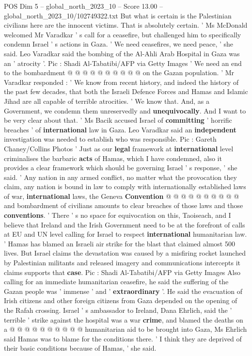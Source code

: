\begin{textsample}{POS Dim 5 – global\_north\_2023\_10 – Score 13.00 – global\_north\_2023\_10/102749322.txt}
But what is certain is the Palestinian civilians here are the innocent victims.
That is absolutely certain. ' Ms McDonald welcomed Mr Varadkar ' s call for a ceasefire, but challenged him to specifically condemn Israel ' s actions in Gaza. ' We need ceasefires, we need peace, ' she said.
Leo Varadkar said the bombing of the Al-Ahli Arab Hospital in Gaza was an ' atrocity '.
Pic : Shadi Al-Tabatibi/AFP via Getty Images ' We need an end to the bombardment @ @ @ @ @ @ @ @ @ @ on the Gazan population. ' Mr Varadkar responded : ' We know from recent history, and indeed the history of the past few decades, that both the Israeli Defence Forces and Hamas and Islamic Jihad are all capable of terrible atrocities. ' We know that.
And, as a Government, we condemn them unreservedly and \textbf{unequivocally}.
And I want to be very clear about that. ' Ms Bacik accused Israel of \textbf{committing} ' horrific breaches ' of \textbf{international} law in Gaza.
Leo Varadkar said an \textbf{independent} investigation was needed to establish who was responsible.
Pic : Gareth Chaney/Collins Photos ' Just as our \textbf{legal} framework at \textbf{international} level criminalises the barbaric \textbf{acts} of Hamas, which I have condemned, also it provides a clear framework which should be governing Israel ' s response, ' she said. ' Any nation in any armed conflict, no matter what the provocation they claim, any nation is bound in law to comply with internationally established laws of war, \textbf{international} laws, the Geneva \textbf{Convention} @ @ @ @ @ @ @ @ @ @ and bombardment of civilians amounts to clear breaches of those laws and those \textbf{conventions}. ' There ' s no space for equivocation on this, Taoiseach, and I believe that Ireland and the Irish Government need to be at the forefront of calls at EU and UN level calling for Israel to respect \textbf{international} humanitarian law. ' Hamas has blamed an Israeli air strike for the blast that claimed almost 500 lives.
But Israel claims the devastation was caused by a misfiring rocket launched by Palestinian militants and released imagery and communications intercepts it claims supports that \textbf{case}.
Pic : Shadi Al-Tabatibi/AFP via Getty Images Also calling for an immediate humanitarian ceasefire, he said the suffering of the Gazan people was ' immense ' and ' \textbf{extraordinary} '.
He said the evacuation of Irish citizens and other foreign citizens from Gaza depended on the opening of the Rafah crossing.
Israel ' s ambassador to Ireland, Dana Ehrlich, said the ' terrible ' strike against the hospital was a war \textbf{crime}, and blamed the deaths on a @ @ @ @ @ @ @ @ @ @ humanitarian aid to be brought into Gaza, Ms Ehrlich said Hamas was to blame for the conditions there. ' I think they are deprived of their basic conditions because of Hamas, ' she said.

\end{textsample}
